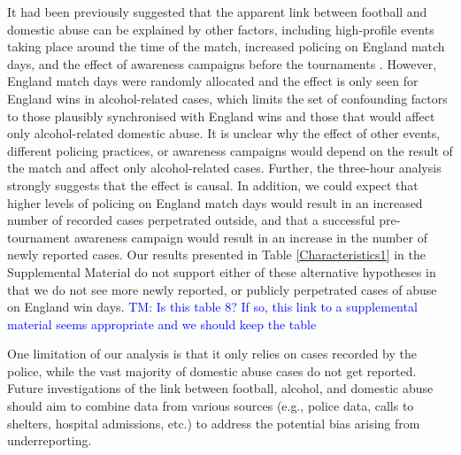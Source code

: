 \documentclass[12pt, a4paper]{article}
\newcommand{\TM}[1]{\textcolor{blue}{TM: #1}}
\begin{document}
It had been previously suggested that the apparent link between football and domestic abuse can be explained by other factors, including high-profile events taking place around the time of the match, increased policing on England match days, and the effect of awareness campaigns before the tournaments \cite{Brooks-Hay2018}. 
However, England match days were randomly allocated and the effect is only seen for England wins in alcohol-related cases, which limits the set of confounding factors to those plausibly synchronised with England wins and those that would affect only alcohol-related domestic abuse. 
It is unclear why the effect of other events, different policing practices, or awareness campaigns would depend on the result of the match and affect only alcohol-related cases. 
Further, the three-hour analysis strongly suggests that the effect is causal.
In addition, we could expect that higher levels of policing on England match days would result in an increased number of recorded cases perpetrated outside, and that a successful pre-tournament awareness campaign would result in an increase in the number of newly reported cases. 
Our results presented in Table \ref{Characteristics1} in the Supplemental Material do not support either of these alternative hypotheses in that we do not see more newly reported, or publicly perpetrated cases of abuse on England win days. \TM{Is this table 8? If so, this link to a supplemental material seems appropriate and we should keep the table}

One limitation of our analysis is that it only relies on cases recorded by the police, while the vast majority of domestic abuse cases do not get reported. Future investigations of the link between football, alcohol, and domestic abuse should aim to combine data from various sources (e.g., police data, calls to shelters, hospital admissions, etc.) to address the potential bias arising from underreporting. 



\end{document}
